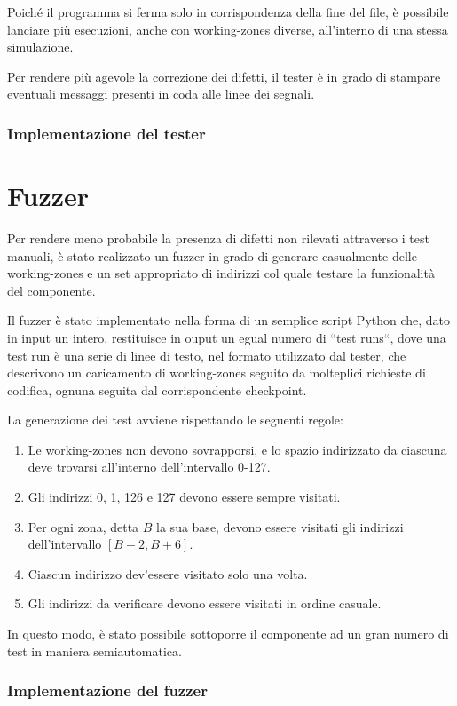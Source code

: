\documentclass[11pt,a4paper]{article}
\begin{document}
Poiché il programma si ferma solo in corrispondenza della fine del file, è possibile lanciare più esecuzioni, anche con working-zones diverse, all'interno
di una stessa simulazione.

Per rendere più agevole la correzione dei difetti, il tester è in grado di stampare eventuali messaggi presenti in coda alle linee dei segnali.

\pagebreak
\subsubsection{Implementazione del tester}

\pagebreak

\section{Fuzzer}
\label{appendix:fuzzer}
Per rendere meno probabile la presenza di difetti non rilevati attraverso i test manuali, è stato realizzato un fuzzer in grado di generare casualmente
delle working-zones e un set appropriato di indirizzi col quale testare la funzionalità del componente.

Il fuzzer è stato implementato nella forma di un semplice script Python che, dato in input un intero, restituisce in ouput un egual numero di
``test runs``, dove una test run è una serie di linee di testo, nel formato utilizzato dal tester, che descrivono un caricamento di working-zones seguito
da molteplici richieste di codifica, ognuna seguita dal corrispondente checkpoint.

La generazione dei test avviene rispettando le seguenti regole:
\begin{enumerate}
    \item Le working-zones non devono sovrapporsi, e lo spazio indirizzato da ciascuna deve trovarsi all'interno dell'intervallo 0-127.
    \item Gli indirizzi 0, 1, 126 e 127 devono essere sempre visitati.
    \item Per ogni zona, detta $B$ la sua base, devono essere visitati gli indirizzi dell'intervallo $[B - 2, B + 6]$.
    \item Ciascun indirizzo dev'essere visitato solo una volta.
    \item Gli indirizzi da verificare devono essere visitati in ordine casuale.
\end{enumerate}

In questo modo, è stato possibile sottoporre il componente ad un gran numero di test in maniera semiautomatica.

\pagebreak
\subsubsection{Implementazione del fuzzer}

\end{document}
